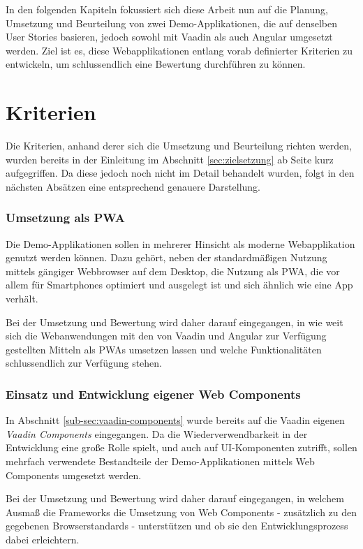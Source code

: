 \documentclass[a4paper,12pt,twoside]{scrreprt}
\begin{document}
In den folgenden Kapiteln fokussiert sich diese Arbeit nun auf die Planung, Umsetzung und Beurteilung von zwei Demo-Applikationen, die auf denselben User Stories basieren, jedoch sowohl mit Vaadin als auch Angular umgesetzt werden. Ziel ist es, diese Webapplikationen entlang vorab definierter Kriterien zu entwickeln, um schlussendlich eine Bewertung durchführen zu können.

\section{Kriterien}
\label{sec:kriterien}
Die Kriterien, anhand derer sich die Umsetzung und Beurteilung richten werden, wurden bereits in der Einleitung im Abschnitt \ref{sec:zielsetzung} ab Seite \pageref{sec:zielsetzung} kurz aufgegriffen. Da diese jedoch noch nicht im Detail behandelt wurden, folgt in den nächsten Absätzen eine entsprechend genauere Darstellung.

\subsubsection*{Umsetzung als \acl{PWA}}
\label{sub-sec:kriterien-pwa}
Die Demo-Applikationen sollen in mehrerer Hinsicht als moderne Webapplikation genutzt werden können. Dazu gehört, neben der standardmäßigen Nutzung mittels gängiger Webbrowser auf dem Desktop, die Nutzung als \ac{PWA}, die vor allem für Smartphones optimiert und ausgelegt ist und sich ähnlich wie eine App verhält.

Bei der Umsetzung und Bewertung wird daher darauf eingegangen, in wie weit sich die Webanwendungen mit den von Vaadin und Angular zur Verfügung gestellten Mitteln als \acp{PWA} umsetzen lassen und welche Funktionalitäten schlussendlich zur Verfügung stehen.

\subsubsection*{Einsatz und Entwicklung eigener Web Components}
\label{sub-sec:kriterien-web-components}
In Abschnitt \ref{sub-sec:vaadin-components} wurde bereits auf die Vaadin eigenen \textit{Vaadin Components} eingegangen. Da die Wiederverwendbarkeit in der Entwicklung eine große Rolle spielt, und auch auf \acs{UI}-Komponenten zutrifft, sollen mehrfach verwendete Bestandteile der Demo-Applikationen mittels Web Components umgesetzt werden.

Bei der Umsetzung und Bewertung wird daher darauf eingegangen, in welchem Ausmaß die Frameworks die Umsetzung von Web Components - zusätzlich zu den gegebenen Browserstandards - unterstützen und ob sie den Entwicklungsprozess dabei erleichtern.
\end{document}
